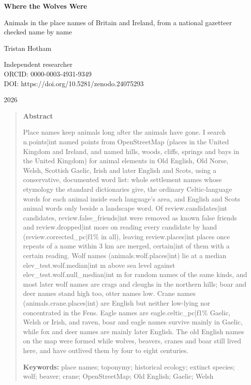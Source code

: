 \documentclass[11pt,a4paper]{article}
\begin{document}
\begin{center}
{\Large\bfseries Where the Wolves Were\par}
\vspace{0.4em}
{\large Animals in the place names of Britain and Ireland, from a national gazetteer checked name by name\par}
\vspace{1.2em}
{\large Tristan Hotham\par}
\vspace{0.3em}
{\small Independent researcher\\
ORCID: 0000-0003-4931-9349\\
DOI: https://doi.org/10.5281/zenodo.24075293\par}
\vspace{0.8em}
2026
\end{center}

\begin{quote}
\small
\begin{center}\textbf{Abstract}\end{center}
Place names keep animals long after the animals have gone. I search {{n.points|int}} named points from OpenStreetMap (places in the United Kingdom and Ireland, and named hills, woods, cliffs, springs and bays in the United Kingdom) for animal elements in Old English, Old Norse, Welsh, Scottish Gaelic, Irish and later English and Scots, using a conservative, documented word list: whole settlement names whose etymology the standard dictionaries give, the ordinary Celtic-language words for each animal inside each language's area, and English and Scots animal words only beside a landscape word. Of {{review.candidates|int}} candidates, {{review.false_friends|int}} were removed as known false friends and {{review.dropped|int}} more on reading every candidate by hand ({{review.corrected_pc|f1}}\% in all), leaving {{review.places|int}} places once repeats of a name within 3 km are merged, {{certain|int}} of them with a certain reading. Wolf names ({{animals.wolf.places|int}}) lie at a median {{elev_test.wolf.median|int}} m above sea level against {{elev_test.wolf.null_median|int}} m for random names of the same kinds, and most later wolf names are crags and cleughs in the northern hills; boar and deer names stand high too, otter names low. Crane names ({{animals.crane.places|int}}) are English but neither low-lying nor concentrated in the Fens. Eagle names are {{eagle.celtic_pc|f1}}\% Gaelic, Welsh or Irish, and raven, boar and eagle names survive mainly in Gaelic, while fox and deer names are mainly later English. The old English names on the map were formed while wolves, beavers, cranes and boar still lived here, and have outlived them by four to eight centuries.

\textbf{Keywords:} place names; toponymy; historical ecology; extinct species; wolf; beaver; crane; OpenStreetMap; Old English; Gaelic; Welsh
\end{quote}
\end{document}
